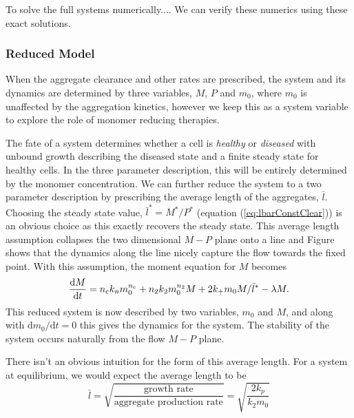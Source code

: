 To solve the full systems numerically.... We can verify these numerics using these exact solutions.

\subsubsection{Reduced Model}

When the aggregate clearance and other rates are prescribed, the system and its dynamics are determined by three variables, $M$, $P$ and $m_0$, where $m_0$ is unaffected by the aggregation kinetics, however we keep this as a system variable to explore the role of monomer reducing therapies.

The fate of a system determines whether a cell is \textit{healthy} or \textit{diseased} with unbound growth describing the diseased state and a finite steady state for healthy cells. In the three parameter description, this will be entirely determined by the monomer concentration. We can further reduce the system to a two parameter description by prescribing the average length of the aggregates, $\bar{l}$. Choosing the steady state value, $\bar{l}^*=M^*/P^*$ (equation (\ref{eq:lbarConstClear})) is an obvious choice as this exactly recovers the steady state. This average length assumption collapses the two dimensional $M-P$ plane onto a line and Figure  shows that the dynamics along the line nicely capture the flow towards the fixed point. With this assumption, the moment equation for $M$ becomes
\begin{equation}
    \frac{\text{d}M}{\text{d}t}= n_{\mathrm{c}} k_n m_0^{n_{\mathrm{c}}} + n_2 k_2 m_0^{n_2} M + 2 k_+ m_0 M/\bar{l}^* - \lambda M.
\end{equation}
This reduced system is now described by two variables, $m_0$ and $M$, and along with $\text{d}m_0/\text{d}t=0$ this gives the dynamics for the system. The stability of the system occurs naturally from the flow $M-P$ plane.

There isn't an obvious intuition for the form of this average length. For a system at equilibrium, we would expect the average length to be
\begin{equation}
    \bar{l} = \sqrt{\frac{\text{growth rate}}{\text{aggregate production rate}}} = \sqrt{\frac{2 k_p}{k_2 m_0}}
\end{equation}
 


